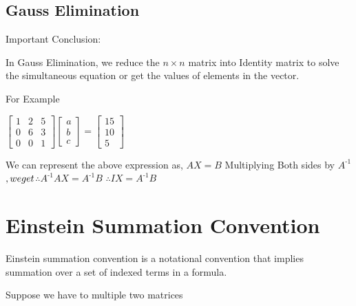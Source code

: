 \documentclass[a4paper,12pt]{article}
\begin{document}
\begin{flushleft}
\begin{flushleft}
\subsection{Gauss Elimination}
\begin{flushleft}
Important Conclusion:
\newline

In Gauss Elimination, we reduce the $n\times n$ matrix into Identity matrix to solve the simultaneous equation or get the values of elements in the vector. 

For Example
\newline

$\begin{bmatrix}
1 & 2 & 5 \\
0 & 6 & 3 \\
0 & 0 & 1
\end{bmatrix} 
\begin{bmatrix}
a \\
b \\
c
\end{bmatrix} = 
\begin{bmatrix}
15\\
10\\
5
\end{bmatrix}$
\newline

We can represent the above expression as,
\newline
$AX = B$
    \newline
    Multiplying Both sides by $A^{\mbox{-} 1}$$, we get
    \newline
    $$\therefore  A^{\mbox{-} 1}AX = A^{\mbox{-}1}B$
    \newline
    $\therefore IX = A^{\mbox{-}1}B$
    \newline
    
\end{flushleft}

\section{Einstein Summation Convention}
\begin{flushleft}
Einstein summation convention is a notational convention that implies summation over a set of indexed terms in a formula.
\newline

Suppose we have to multiple two matrices
\newline


\end{flushleft}
\end{flushleft}
\end{flushleft}
\end{document}
